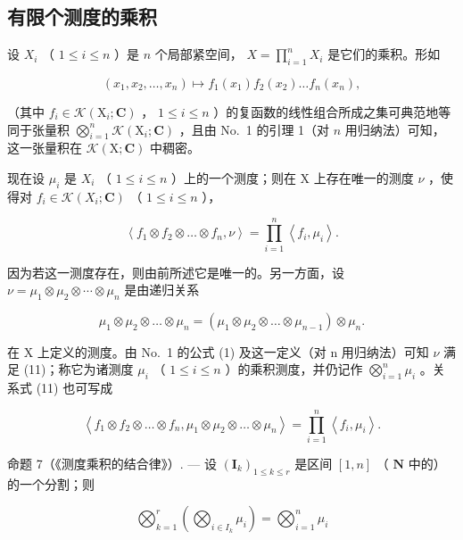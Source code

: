 \subsection{有限个测度的乘积}

设 \(X_{i}\) （ \(1 \leqslant i \leqslant n\) ）是 \(n\) 个局部紧空间， \(X = \prod_{i=1}^{n} X_{i}\) 是它们的乘积。形如

\[
\left(x _ {1}, x _ {2}, \dots , x _ {n}\right) \mapsto f _ {1} \left(x _ {1}\right) f _ {2} \left(x _ {2}\right) \dots f _ {n} \left(x _ {n}\right),
\]

（其中 \(f_{i} \in \mathcal{K}(\mathrm{X}_{i};\mathbf{C})\) ， \(1 \leqslant i \leqslant n\) ）的复函数的线性组合所成之集可典范地等同于张量积 \(\bigotimes_{i=1}^{n} \mathcal{K}(\mathrm{X}_{i};\mathbf{C})\) ，且由 No.~1 的引理 1（对 \(n\) 用归纳法）可知，这一张量积在 \(\mathcal{K}(\mathrm{X};\mathbf{C})\) 中稠密。

现在设 \(\mu_{i}\) 是 \(X_{i}\) （ \(1 \leqslant i \leqslant n\) ）上的一个测度；则在 X 上存在唯一的测度 \(\nu\) ，使得对 \(f_{i} \in \mathcal{K}(X_{i}; \mathbf{C})\) （ \(1 \leqslant i \leqslant n\) ），

\[
\left\langle f _ {1} \otimes f _ {2} \otimes \dots \otimes f _ {n}, \nu \right\rangle = \prod_ {i = 1} ^ {n} \left\langle f _ {i}, \mu_ {i} \right\rangle .\tag{11}
\]

因为若这一测度存在，则由前所述它是唯一的。另一方面，设 \(\nu = \mu_{1} \otimes \mu_{2} \otimes \cdots \otimes \mu_{n}\) 是由递归关系

\[
\mu_ {1} \otimes \mu_ {2} \otimes \dots \otimes \mu_ {n} = (\mu_ {1} \otimes \mu_ {2} \otimes \dots \otimes \mu_ {n - 1}) \otimes \mu_ {n}.
\]

在 X 上定义的测度。由 No.~1 的公式 (1) 及这一定义（对 n 用归纳法）可知 \(\nu\) 满足 (11)；称它为诸测度 \(\mu_{i}\) （ \(1 \leqslant i \leqslant n\) ）的乘积测度，并仍记作 \(\bigotimes_{i=1}^{n} \mu_{i}\) 。关系式 (11) 也可写成

\[
\left\langle f _ {1} \otimes f _ {2} \otimes \dots \otimes f _ {n}, \mu_ {1} \otimes \mu_ {2} \otimes \dots \otimes \mu_ {n} \right\rangle = \prod_ {i = 1} ^ {n} \left\langle f _ {i}, \mu_ {i} \right\rangle .\tag{12}
\]

命题 7（《测度乘积的结合律》）. --- 设 \((\mathbf{I}_k)_{1 \leqslant k \leqslant r}\) 是区间 \([1, n]\) （ \(\mathbf{N}\) 中的）的一个分割；则

\[
\bigotimes_ {k = 1} ^ {r} \left(\bigotimes_ {i \in I _ {k}} \mu_ {i}\right) = \bigotimes_ {i = 1} ^ {n} \mu_ {i}\tag{13}
\]

